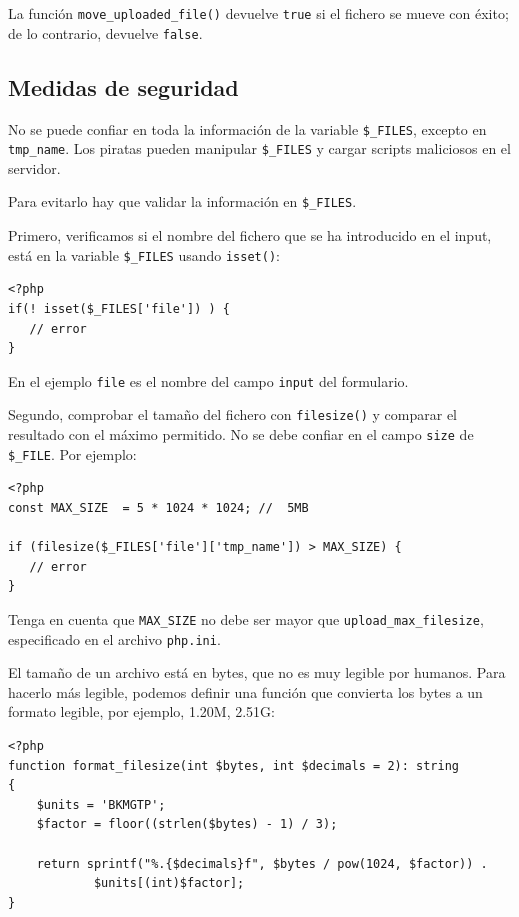 \documentclass[11pt]{article}
\begin{document}
La función \texttt{move\_uploaded\_file()} devuelve \texttt{true} si el fichero se
mueve con éxito; de lo contrario, devuelve \texttt{false}.

\subsection{Medidas de seguridad}
\label{sec:orga39f0a8}
No se puede confiar en toda la información de la variable \texttt{\$\_FILES},
excepto en \texttt{tmp\_name}. Los piratas pueden manipular
\texttt{\$\_FILES} y cargar scripts maliciosos en el servidor.

Para evitarlo hay que validar la información en  \texttt{\$\_FILES}.

Primero, verificamos si el nombre del fichero que se ha introducido en el
input, está en la variable \texttt{\$\_FILES} usando \texttt{isset()}:
\begin{verbatim}
<?php
if(! isset($_FILES['file']) ) {
   // error
}
\end{verbatim}

En el ejemplo \texttt{file} es el nombre del campo \texttt{input} del formulario.

Segundo, comprobar el tamaño del fichero con \texttt{filesize()} y comparar
el resultado con el máximo permitido. No se debe confiar en el campo
\texttt{size} de \texttt{\$\_FILE}. Por ejemplo:
\begin{verbatim}
<?php
const MAX_SIZE  = 5 * 1024 * 1024; //  5MB

if (filesize($_FILES['file']['tmp_name']) > MAX_SIZE) {
   // error
}
\end{verbatim}

\begin{mdframed}
Tenga en cuenta que \texttt{MAX\_SIZE} no debe ser mayor que
\texttt{upload\_max\_filesize}, especificado en el archivo \texttt{php.ini}.
\end{mdframed}

El tamaño de un archivo está en bytes, que no es muy legible por
humanos. Para hacerlo más legible, podemos definir una función que
convierta los bytes a un formato legible, por ejemplo, 1.20M, 2.51G:
\begin{verbatim}
<?php
function format_filesize(int $bytes, int $decimals = 2): string
{
    $units = 'BKMGTP';
    $factor = floor((strlen($bytes) - 1) / 3);

    return sprintf("%.{$decimals}f", $bytes / pow(1024, $factor)) .
            $units[(int)$factor];
}
\end{verbatim}
\end{document}
